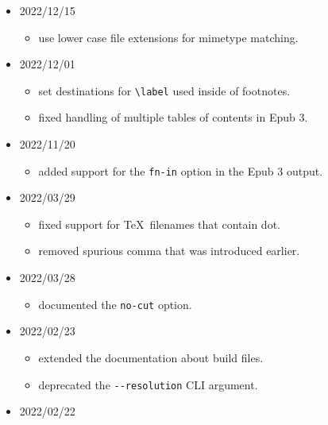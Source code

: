 \begin{itemize}
  \begin{itemize}
  \tightlist
  \item
    fixed handling of metadata for filenames with accented characters.
  \end{itemize}
\item
  2022/12/15

  \begin{itemize}
  \tightlist
  \item
    use lower case file extensions for mimetype matching.
  \end{itemize}
\item
  2022/12/01

  \begin{itemize}
  \tightlist
  \item
    set destinations for \texttt{\textbackslash{}label} used inside of
    footnotes.
  \item
    fixed handling of multiple tables of contents in Epub 3.
  \end{itemize}
\item
  2022/11/20

  \begin{itemize}
  \tightlist
  \item
    added support for the \texttt{fn-in} option in the Epub 3 output.
  \end{itemize}
\item
  2022/03/29

  \begin{itemize}
  \tightlist
  \item
    fixed support for \TeX~filenames that contain dot.
  \item
    removed spurious comma that was introduced earlier.
  \end{itemize}
\item
  2022/03/28

  \begin{itemize}
  \tightlist
  \item
    documented the \texttt{no-cut} option.
  \end{itemize}
\item
  2022/02/23

  \begin{itemize}
  \tightlist
  \item
    extended the documentation about build files.
  \item
    deprecated the \texttt{-\/-resolution} CLI argument.
  \end{itemize}
\item
  2022/02/22


\end{itemize}
